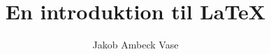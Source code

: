 \documentclass{report}
\begin{document}
\title{En introduktion til \LaTeX}

\author{Jakob Ambeck Vase}

\maketitle

\listoftodos







\printbibliography

\appendix


\end{document}
